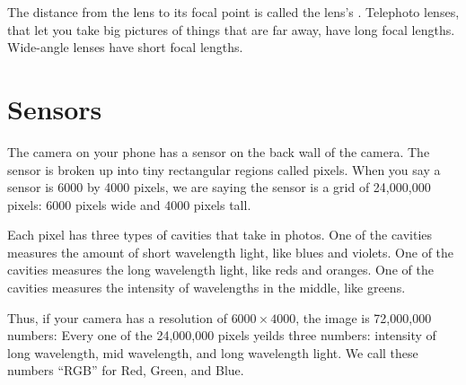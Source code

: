 The distance from the lens to its focal point is called the lens's
. Telephoto lenses, that let you take big
pictures of things that are far away, have long focal lengths.
Wide-angle lenses have short focal lengths.

\section{Sensors}

The camera on your phone has a sensor on the back wall of the
camera. The sensor is broken up into tiny rectangular regions called
pixels.  When you say a sensor is 6000 by 4000 pixels, we are saying
the sensor is a grid of 24,000,000 pixels: 6000 pixels wide and
4000 pixels tall.

Each pixel has three types of cavities that take in photos. One of the
cavities measures the amount of short wavelength light, like blues and
violets. One of the cavities measures the long wavelength light, like
reds and oranges. One of the cavities measures the intensity of
wavelengths in the middle, like greens.

Thus, if your camera has a resolution of $6000 \times 4000$, the image
is 72,000,000 numbers: Every one of the 24,000,000 pixels yeilds three
numbers: intensity of long wavelength, mid wavelength, and long
wavelength light. We call these numbers ``RGB'' for Red, Green, and
Blue.



